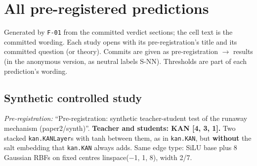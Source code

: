 \section{All pre-registered predictions}\label{app:prereg}

Generated by \texttt{F-01} from the committed verdict sections; the cell text is the committed wording. Each study opens with its pre-registration's title and its committed question (or theory). Commits are given as pre-registration $\to$ results (in the anonymous version, as neutral labels S-NN). Thresholds are part of each prediction's wording.

\subsection{Synthetic controlled study}
\noindent\textit{Pre-registration:} ``Pre-registration: synthetic teacher-student test of the runaway mechanism (paper2/synth)''. \textbf{Teacher and students: KAN [4, 3, 1].} Two stacked \texttt{kan.KANLayer}s with tanh between them, as in \texttt{kan.KAN}, but \textbf{without} the salt embedding that \texttt{kan.KAN} always adds. Same edge type: SiLU base plus 8 Gaussian RBFs on fixed centres linspace($-$1, 1, 8), width 2/7.

